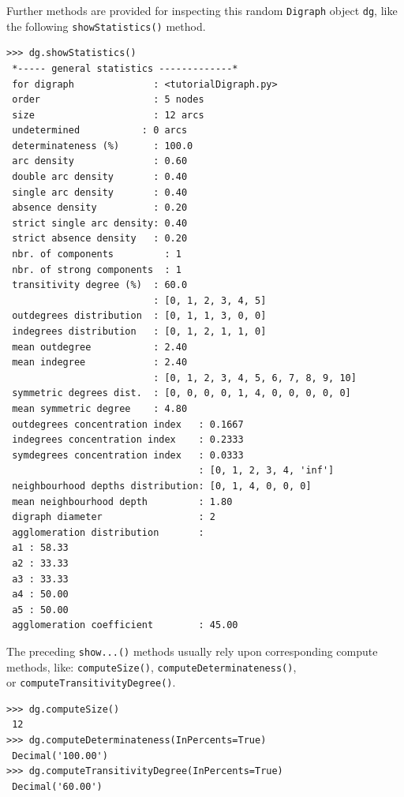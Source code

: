 Further methods are provided for inspecting this random \texttt{Digraph} object \texttt{dg}, like the following \texttt{showStatistics()} method.
\begin{lstlisting}[caption={Inspecting a \texttt{Digraph} object},label=list:1.5]
>>> dg.showStatistics()
 *----- general statistics -------------*
 for digraph              : <tutorialDigraph.py>
 order                    : 5 nodes
 size                     : 12 arcs
 undetermined           : 0 arcs
 determinateness (%)      : 100.0
 arc density              : 0.60
 double arc density       : 0.40
 single arc density       : 0.40
 absence density          : 0.20
 strict single arc density: 0.40
 strict absence density   : 0.20
 nbr. of components         : 1
 nbr. of strong components  : 1
 transitivity degree (%)  : 60.0
                          : [0, 1, 2, 3, 4, 5]
 outdegrees distribution  : [0, 1, 1, 3, 0, 0]
 indegrees distribution   : [0, 1, 2, 1, 1, 0]
 mean outdegree           : 2.40
 mean indegree            : 2.40
                          : [0, 1, 2, 3, 4, 5, 6, 7, 8, 9, 10]
 symmetric degrees dist.  : [0, 0, 0, 0, 1, 4, 0, 0, 0, 0, 0]
 mean symmetric degree    : 4.80
 outdegrees concentration index   : 0.1667
 indegrees concentration index    : 0.2333
 symdegrees concentration index   : 0.0333
                                  : [0, 1, 2, 3, 4, 'inf']
 neighbourhood depths distribution: [0, 1, 4, 0, 0, 0]
 mean neighbourhood depth         : 1.80
 digraph diameter                 : 2
 agglomeration distribution       :
 a1 : 58.33
 a2 : 33.33
 a3 : 33.33
 a4 : 50.00
 a5 : 50.00
 agglomeration coefficient        : 45.00
\end{lstlisting}

The preceding \texttt{show...()} methods usually rely upon corresponding compute methods, like: \texttt{computeSize()}, \texttt{computeDeterminateness()},\\ or \texttt{computeTransitivityDegree()}.
\begin{lstlisting}[caption={Various \texttt{compute...()} methods.},label=list:1.6]
>>> dg.computeSize()
 12
>>> dg.computeDeterminateness(InPercents=True)
 Decimal('100.00')
>>> dg.computeTransitivityDegree(InPercents=True)
 Decimal('60.00')
\end{lstlisting}

